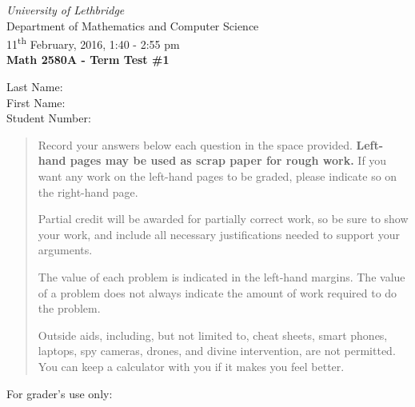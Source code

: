 \documentclass[12pt]{article}
\newcommand{\skipline}{\vspace{12pt}}
\begin{document}
\author{Instructor: Sean Fitzpatrick}
\thispagestyle{plain}
\begin{center}
\emph{University of Lethbridge}\\
Department of Mathematics and Computer Science\\
11\textsuperscript{th} February, 2016, 1:40 - 2:55 pm\\
{\bf Math 2580A - Term Test \#1}\\
\end{center}
\skipline \skipline \skipline \noindent \skipline
Last Name:\underline{\hspace{350pt}}\\
\skipline
First Name:\underline{\hspace{348pt}}\\
\skipline
Student Number:\underline{\hspace{322pt}}\\


\vspace{0.5in}


\begin{quote}
 Record your answers below each question in the space provided.    {\bf Left-hand pages may be used as scrap paper for rough work.}  If you want any work on the left-hand pages to be graded, please indicate so on the right-hand page.
 
 \bigskip
 
Partial credit will be awarded for partially correct work, so be sure to show your work, and include all necessary justifications needed to support your arguments. 

The value of each problem is indicated in the left-hand margins. The value of a problem does not always indicate the amount of work required to do the problem.

Outside aids, including, but not limited to, cheat sheets, smart phones, laptops, spy cameras, drones, and divine intervention, are not permitted. You can keep a calculator with you if it makes you feel better.
\end{quote}


\vspace{0.5in}

For grader's use only:
\end{document}
